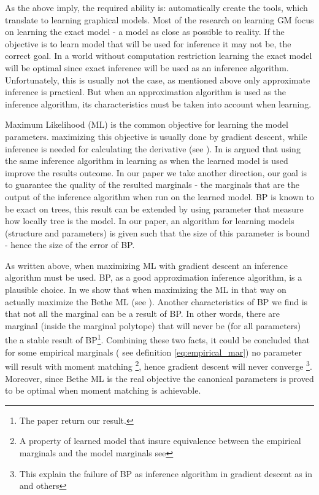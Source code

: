 As the above imply, the required ability is: automatically create the tools, which translate to learning graphical models.
Most of the research on learning GM focus on learning the exact model - a model as close as possible to reality.
If the objective is to learn model that will be used for inference it may not be, the correct goal.
In a world without computation restriction learning the exact model will be optimal since exact inference will be used as an inference algorithm.
Unfortunately, this is usually not the case, as mentioned above only approximate inference is practical.
But when an approximation algorithm is used as the inference algorithm, its characteristics must be taken into account when learning.

Maximum Likelihood (ML) is the common objective for learning the model parameters.
maximizing this objective is usually done by gradient descent, while inference is needed for calculating the derivative (see ).
In \cite{wainwright2006estimating} is argued that using the same inference algorithm in learning as when the learned model is used improve the results outcome.
In our paper \cite{heinemann2014inferning} we take another direction, our goal is to guarantee the quality of the resulted marginals - the marginals that are the output of the inference algorithm when run on the learned model.
BP is known to be exact on trees, this result can be extended by using parameter that measure how locally tree is the model.
In our paper, an algorithm for learning models (structure and parameters) is given such that the size of this parameter is bound - hence the size of the error of BP.

As written above, when maximizing ML with gradient descent an inference algorithm must be used.
BP, as a good approximation inference algorithm, is a plausible choice.
In \cite{heinemann2012cannot} we show that when maximizing the ML in that way on actually maximize the Bethe ML (see ).
Another characteristics of BP we find is that not all the marginal can be a result of BP.
In other words, there are marginal (inside the marginal polytope) that will never be (for all parameters) the a stable result of BP\footnote{ The paper \cite{pitkow2011learning} return our result.}.
Combining these two facts, it could be concluded that for some empirical marginals ( see definition \eqref{eq:empirical_mar}) no parameter will result with moment matching \footnote{ A property of learned model that insure equivalence between the empirical marginals and the model marginals see }, hence gradient descent will never converge \footnote{This explain the failure of BP as inference algorithm in gradient descent as in \cite{wainwright2006estimating} and others}.
Moreover, since Bethe ML is the real objective the canonical parameters is proved to be optimal when moment matching is achievable.

